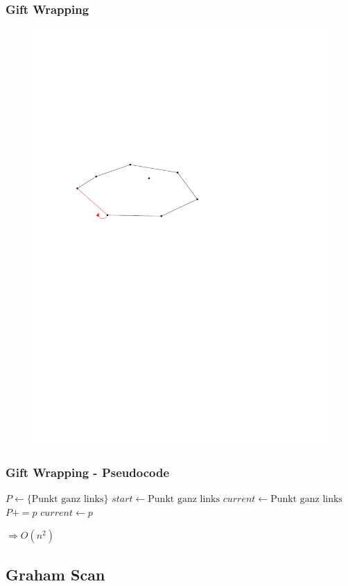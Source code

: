 \begin{frame}
	\frametitle{{Gift Wrapping}}
\begin{figure}[htbp]
	\begin{center}
  	\includegraphics[width=.8\linewidth]{bilder/giftwrap7}
	\end{center}
\end{figure}
\end{frame}


\begin{frame}
	\frametitle{{Gift Wrapping - Pseudocode}}
	\begin{algorithmic}
\State $P\gets \{\mbox{Punkt ganz links}\}$
\State $start\gets \mbox{Punkt ganz links}$
\State $current\gets \mbox{Punkt ganz links}$
\pause
\Repeat 
			\State $P += p$
			\State $current \gets p$
		\EndIf
	\EndFor
{}
\end{algorithmic}
\pause
$\Rightarrow O(n^2)$
\end{frame}

\subsection{Graham Scan}

